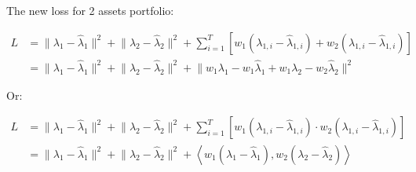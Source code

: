 \documentclass{article}
\begin{document}
The new loss for 2 assets portfolio:


\begin{align*}
    L &=
    \lVert \lambda_1 - \hat{\lambda}_1 \rVert^2
    + \lVert \lambda_2 - \hat{\lambda}_2 \rVert^2
    + \sum_{i = 1}^{T} \left[
        w_1 (\lambda_{1, i} - \hat{\lambda}_{1, i}) + w_2 (\lambda_{1, i} - \hat{\lambda}_{1, i})
    \right] \\
    &= \lVert \lambda_1 - \hat{\lambda}_1 \rVert^2
    + \lVert \lambda_2 - \hat{\lambda}_2 \rVert^2
    + \lVert w_1 \lambda_1 - w_1 \hat{\lambda}_1 + w_1 \lambda_2 - w_2 \hat{\lambda}_2 \rVert^2
\end{align*}


Or:

\begin{align*}
    L &=
    \lVert \lambda_1 - \hat{\lambda}_1 \rVert^2
    + \lVert \lambda_2 - \hat{\lambda}_2 \rVert^2
    + \sum_{i = 1}^{T} \left[
        w_1 (\lambda_{1, i} - \hat{\lambda}_{1, i}) \cdot w_2 (\lambda_{1, i} - \hat{\lambda}_{1, i})
    \right] \\
    &= \lVert \lambda_1 - \hat{\lambda}_1 \rVert^2
    + \lVert \lambda_2 - \hat{\lambda}_2 \rVert^2
    + \left< w_1 (\lambda_1 - \hat{\lambda}_1), w_2 (\lambda_2 - \hat{\lambda}_2) \right>
\end{align*}
\end{document}
